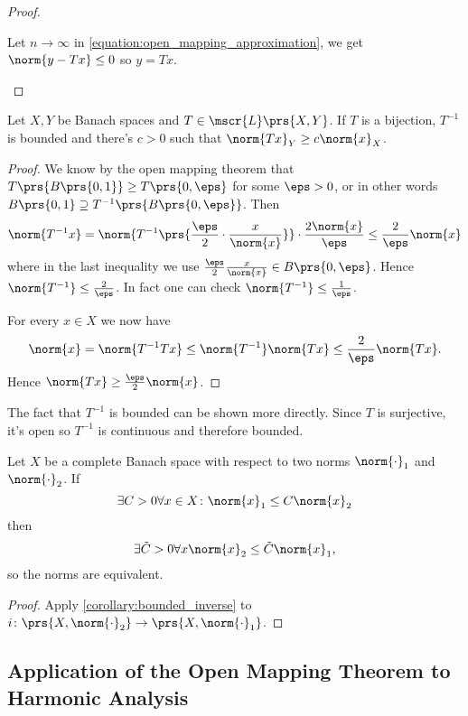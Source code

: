 \documentclass[10pt, twoside]{book}
\begin{document}
\begin{proof}
\begin{description}
Let $n \to \infty$ in \eqref{equation:open_mapping_approximation}, we get $\norm{y - Tx} \leq 0$ so $y = Tx$.
\end{description}
\end{proof}

\begin{corollary}\label{corollary:bounded_inverse}
Let $X,Y$ be Banach spaces and $T \in \mscr{L}\prs{X,Y}$. If $T$ is a bijection, $T^{-1}$ is bounded and there's $c > 0$ such that $\norm{Tx}_Y \geq c \norm{x}_X$.
\end{corollary}

\begin{proof}
We know by the open mapping theorem that $T\prs{B\prs{0,1}} \geq T\prs{0,\eps}$ for some $\eps > 0$, or in other words $B\prs{0,1} \supseteq T^{-1}\prs{B\prs{0,\eps}}$. Then
\begin{align*}
\norm{T^{-1} x} = \norm{T^{-1}\prs{\frac{\eps}{2} \cdot \frac{x}{\norm{x}}}} \cdot \frac{2 \norm{x}}{\eps} \leq \frac{2}{\eps} \norm{x}
\end{align*}
where in the last inequality we use $\frac{\eps}{2} \frac{x}{\norm{x}} \in B\prs{0,\eps}$.
Hence
$\norm{T^{-1}} \leq \frac{2}{\eps}$. In fact one can check $\norm{T^{-1}} \leq \frac{1}{\eps}$.

For every $x \in X$ we now have
\[\norm{x} = \norm{T^{-1} T x} \leq \norm{T^{-1}} \norm{Tx} \leq \frac{2}{\eps} \norm{Tx} \text{.}\]
Hence $\norm{Tx} \geq \frac{\eps}{2} \norm{x}$.
\end{proof}

\begin{remark}
The fact that $T^{-1}$ is bounded can be shown more directly. Since $T$ is surjective, it's open so $T^{-1}$ is continuous and therefore bounded.
\end{remark}

\begin{corollary}
Let $X$ be a complete Banach space with respect to two norms $\norm{\cdot}_1$ and $\norm{\cdot}_2$.
If
\[\exists C > 0 \forall x \in X \colon \norm{x}_1 \leq C \norm{x}_2\]
then
\[\exists \tilde{C} > 0 \forall x \norm{x}_2 \leq \tilde{C} \norm{x}_1 \text{,}\]
so the norms are equivalent.
\end{corollary}

\begin{proof}
Apply \ref{corollary:bounded_inverse} to $i \colon \prs{X, \norm{\cdot}_2} \to \prs{X, \norm{\cdot}_1}$.
\end{proof}

\subsection{Application of the Open Mapping Theorem to Harmonic Analysis}
\end{document}
